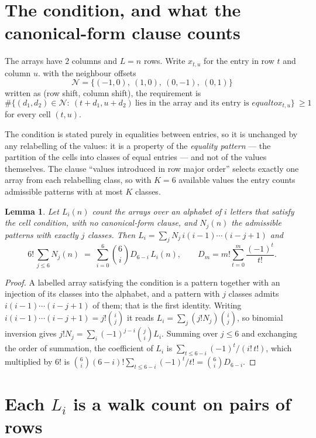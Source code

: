 \documentclass[11pt,a4paper]{article}
\theoremstyle{plain}
\newtheorem{lemma}[theorem]{Lemma}
\theoremstyle{definition}
\begin{document}
\section{The condition, and what the canonical-form clause counts}

The arrays have $2$ columns and $L=n$ rows. Write $x_{t,u}$ for the entry in
row $t$ and column $u$. with the neighbour offsets
\[
\mathcal N=\{(-1,0),\ (1,0),\ (0,-1),\ (0,1)\}
\]
written as (row shift, column shift), the requirement is
\begin{equation}\label{eq:loc}
\#\bigl\{(d_1,d_2)\in\mathcal N:\ (t+d_1,u+d_2)\ \text{lies in the array and its entry is }
equal to x_{t,u}\bigr\}\ \ge1
\end{equation}
for every cell $(t,u)$.

The condition is stated purely in equalities between entries, so it is unchanged by any
relabelling of the values: it is a property of the \emph{equality pattern} --- the partition
of the cells into classes of equal entries --- and not of the values themselves. The clause
``values introduced in row major order'' selects exactly one array from each relabelling
class, so with $K=6$ available values the entry counts admissible patterns with at most $K$
classes.

\begin{lemma}\label{lem:inv}
Let $L_i(n)$ count the arrays over an alphabet of $i$ letters that satisfy the cell
condition, with no canonical-form clause, and $N_j(n)$ the admissible patterns with exactly
$j$ classes. Then $L_i=\sum_j N_j\,i(i-1)\cdots(i-j+1)$ and
\[
6!\,\sum_{j\le 6}N_j(n)\;=\;\sum_{i=0}^{6}\binom{6}{i}D_{6-i}\,L_i(n),
\qquad D_m=m!\sum_{t=0}^{m}\frac{(-1)^t}{t!} .
\]
\end{lemma}

\begin{proof}
A labelled array satisfying the condition is a pattern together with an injection of its
classes into the alphabet, and a pattern with $j$ classes admits $i(i-1)\cdots(i-j+1)$ of
them; that is the first identity. Writing $i(i-1)\cdots(i-j+1)=j!\binom{i}{j}$ it reads
$L_i=\sum_j(j!N_j)\binom{i}{j}$, so binomial inversion gives
$j!N_j=\sum_i(-1)^{j-i}\binom{j}{i}L_i$. Summing over $j\le6$ and exchanging the
order of summation, the coefficient of $L_i$ is
$\sum_{t\le6-i}(-1)^t/(i!\,t!)$, which multiplied by $6!$ is
$\binom{6}{i}(6-i)!\sum_{t\le6-i}(-1)^t/t!=\binom{6}{i}D_{6-i}$.
\end{proof}

\section{Each $L_i$ is a walk count on pairs of rows}
\end{document}
